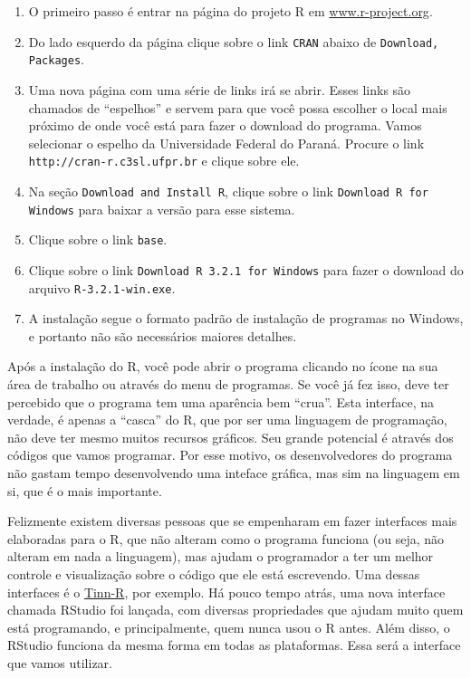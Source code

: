 \documentclass[a4paper,12pt]{article}\usepackage[]{graphicx}\usepackage[]{color}
\providecommand{\R}{\textsf{R}\xspace}
\providecommand{\RStudio}{\textsf{RStudio}\xspace}
\begin{document}
\begin{enumerate}
\item O primeiro passo é entrar na página do projeto \R em
\url{www.r-project.org}.
\item Do lado esquerdo da página clique sobre o link \texttt{CRAN}
  abaixo de \texttt{Download, Packages}.
\item Uma nova página com uma série de links irá se abrir. Esses links
  são chamados de ``espelhos'' e servem para que você possa escolher o
  local mais próximo de onde você está para fazer o download do
  programa. Vamos selecionar o espelho da Universidade Federal do
  Paraná. Procure o link \texttt{http://cran-r.c3sl.ufpr.br} e clique sobre
  ele.
\item Na seção \texttt{Download and Install R}, clique sobre o link
  \texttt{Download R for Windows} para baixar a versão para esse
  sistema.
\item Clique sobre o link \texttt{base}.
\item Clique sobre o link \texttt{Download R 3.2.1 for Windows} para
  fazer o download do arquivo \texttt{R-3.2.1-win.exe}.
\item A instalação segue o formato padrão de instalação de programas no
  Windows, e portanto não são necessários maiores detalhes.
\end{enumerate}

Após a instalação do \R, você pode abrir o programa clicando no ícone na
sua área de trabalho ou através do menu de programas. Se você já fez
isso, deve ter percebido que o programa tem uma aparência bem
``crua''. Esta interface, na verdade, é apenas a ``casca'' do \R, que
por ser uma linguagem de programação, não deve ter mesmo muitos recursos
gráficos. Seu grande potencial é através dos códigos que vamos
programar. Por esse motivo, os desenvolvedores do programa não gastam
tempo desenvolvendo uma inteface gráfica, mas sim na linguagem em si,
que é o mais importante.

Felizmente existem diversas pessoas que se empenharam em fazer
interfaces mais elaboradas para o \R, que não alteram como o programa
funciona (ou seja, não alteram em nada a linguagem), mas ajudam o
programador a ter um melhor controle e visualização sobre o código que
ele está escrevendo. Uma dessas interfaces é o
\href{http://www.sciviews.org/Tinn-R}{Tinn-R}, por exemplo. Há pouco
tempo atrás, uma nova interface chamada \RStudio foi lançada, com
diversas propriedades que ajudam muito quem está programando, e
principalmente, quem nunca usou o \R antes. Além disso, o \RStudio
funciona da mesma forma em todas as plataformas. Essa será a interface
que vamos utilizar.
\end{document}
